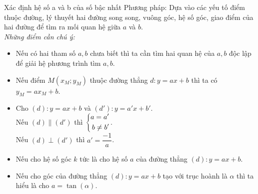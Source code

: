 \begin{dang}{Xác định hệ số a và b của số bậc nhất}
	Phương pháp: Dựa vào các yếu tố điểm thuộc đường, lý thuyết hai đường song song, vuông góc, hệ số góc, giao điểm của hai đường để tìm ra mối quan hệ giữa $a$ và $b$.\\
	\it{Những điểm cần chú ý:}
	\begin{itemize}
		\item Nếu có hai tham số $a,b$ chưa biết thì ta cần tìm hai quan hệ của $a,b$ độc lập để giải hệ phương trình tìm $a,b$.
		\item Nếu điểm $M(x_M;y_M)$ thuộc đường thẳng $d: y=ax+b$ thì ta có $y_M=ax_M+b$.
		\item Cho $(d): y=ax+b$ và $(d'):y=a'x+b'$. \\
		Nếu $(d)\parallel (d')$ thì $\left\{\begin{aligned}a=a'\\
			b\neq b'\end{aligned}\right.$.\\
		Nếu $(d)\perp (d')$ thì $a'=\dfrac{-1}{a}$.
		\item Nếu cho hệ số góc $k$ tức là cho hệ số $a$ của đường thẳng $(d):y=ax+b$.
		\item Nếu cho góc của đường thẳng $(d):y=ax+b$ tạo với trục hoành là $\alpha$ thì ta hiểu là cho $a=\tan(\alpha)$.
	\end{itemize}
\end{dang}

